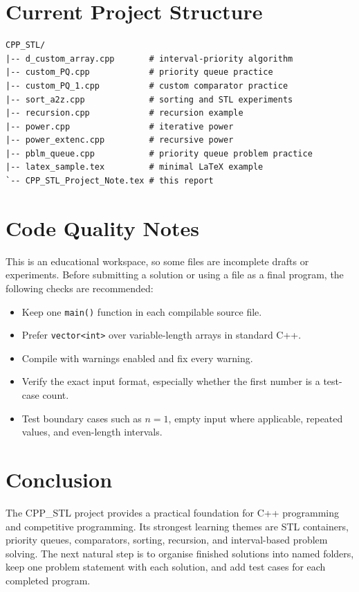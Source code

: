 \documentclass[12pt,a4paper]{article}
\begin{document}
\section{Current Project Structure}

\begin{verbatim}
CPP_STL/
|-- d_custom_array.cpp       # interval-priority algorithm
|-- custom_PQ.cpp            # priority queue practice
|-- custom_PQ_1.cpp          # custom comparator practice
|-- sort_a2z.cpp             # sorting and STL experiments
|-- recursion.cpp            # recursion example
|-- power.cpp                # iterative power
|-- power_extenc.cpp         # recursive power
|-- pblm_queue.cpp           # priority queue problem practice
|-- latex_sample.tex         # minimal LaTeX example
`-- CPP_STL_Project_Note.tex # this report
\end{verbatim}

\section{Code Quality Notes}

This is an educational workspace, so some files are incomplete drafts or
experiments. Before submitting a solution or using a file as a final program,
the following checks are recommended:

\begin{itemize}
    \item Keep one \texttt{main()} function in each compilable source file.
    \item Prefer \texttt{vector<int>} over variable-length arrays in standard C++.
    \item Compile with warnings enabled and fix every warning.
    \item Verify the exact input format, especially whether the first number is
          a test-case count.
    \item Test boundary cases such as \(n=1\), empty input where applicable,
          repeated values, and even-length intervals.
\end{itemize}

\section{Conclusion}

The CPP\_STL project provides a practical foundation for C++ programming and
competitive programming. Its strongest learning themes are STL containers,
priority queues, comparators, sorting, recursion, and interval-based problem
solving. The next natural step is to organise finished solutions into named
folders, keep one problem statement with each solution, and add test cases for
each completed program.
\end{document}
